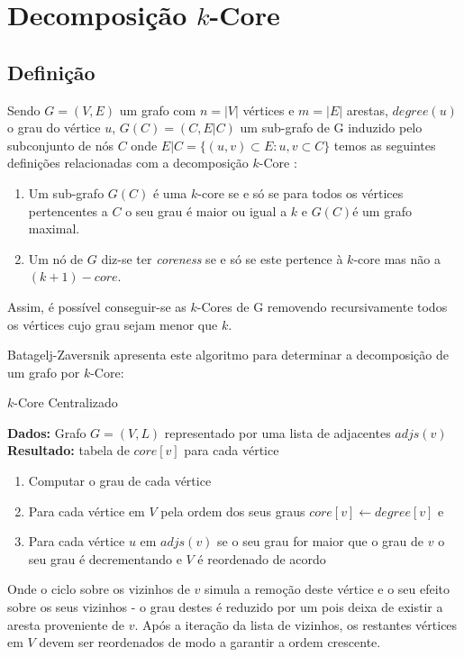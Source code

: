 \renewcommand{\algorithmicrequire}{\textbf{Dados: }}
\renewcommand{\algorithmicensure}{\textbf{Resultado: }}

\section{Decomposição $k$-Core}


\subsection{Definição}
Sendo $G = (V,E)$ um grafo com $n = |V|$ vértices e $m = |E|$ arestas, $degree(u)$ o grau do vértice $u$, $G(C) = (C, E|C)$ um sub-grafo de G induzido pelo subconjunto de nós $C$ onde $E|C = \{(u,v)\subset E : u,v \subset C\} $ temos as seguintes definições relacionadas com a decomposição $k$-Core \cite{kCoreDef}:


	\begin{enumerate}
		\item Um sub-grafo $G(C)$ é uma $k$-core se e só se para todos os vértices pertencentes a $C$ o seu grau é maior ou igual a $k$ e $G(C)$é um grafo maximal.
		\item Um nó de $G$ diz-se ter \textit{coreness} se e só se este pertence à $k$-core mas não a $(k+1)-core$.
	\end{enumerate}


Assim, é possível conseguir-se as $k$-Cores de G removendo recursivamente todos os vértices cujo grau sejam menor que $k$.

Batagelj-Zaversnik apresenta\cite{kCoreCen1,kCoreCen2} este algoritmo para determinar a decomposição de um grafo por $k$-Core:

\begin{algorithm}
\caption{$k$-Core Centralizado}
 \algorithmicrequire{Grafo $G = (V,L)$ representado por uma lista de adjacentes $adjs(v)$}
 \algorithmicensure{tabela de $core[v]$ para cada vértice}
\begin{enumerate}
	\item Computar o grau de cada vértice
	\item Para cada vértice em $V$ pela ordem dos seus graus $core[v] \gets degree[v]$ e
	\item Para cada vértice $u$ em $adjs(v)$ se o seu grau for maior que o grau de $v$ o seu grau é decrementando e $V$ é reordenado de acordo
\end{enumerate}
\end{algorithm}

Onde o ciclo sobre os vizinhos de $v$ simula a remoção deste vértice e o seu efeito sobre os seus vizinhos - o grau destes é reduzido por um pois deixa de existir a aresta proveniente de $v$.
Após a iteração da lista de vizinhos, os restantes vértices em $V$ devem ser reordenados de modo a garantir a ordem crescente.


